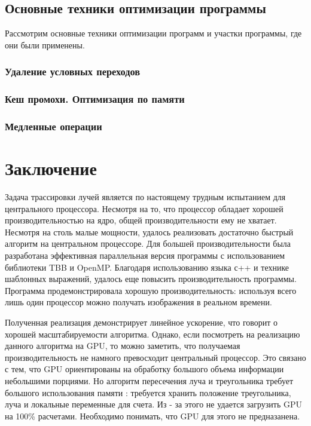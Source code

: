 \documentclass[12pt, a4paper, utf8]{article}
\begin{document}
\subsection{Основные техники оптимизации программы}

Рассмотрим основные техники оптимизации программ и участки программы, где они были применены.

\subsubsection{Удаление условных переходов}


\subsubsection{Кеш промохи. Оптимизация по памяти}


\subsubsection{Медленные операции}



\newpage
\section*{Заключение}
Задача трассировки лучей является по настоящему трудным испытанием для центрального процессора. Несмотря на то, что процессор обладает хорошей производительностью на ядро, общей производительности ему не хватает. Несмотря на столь малые мощности, удалось реализовать достаточно быстрый алгоритм на центральном процессоре. Для большей производительности была разработана эффективная параллельная версия программы с использованием библиотеки TBB и OpenMP. Благодаря использованию языка с++ и технике шаблонных выражений, удалось еще повысить производительность программы. Программа продемонстрировала хорошую производительность: используя всего лишь один процессор можно получать изображения в реальном времени.

Полученная реализация демонстрирует линейное ускорение, что говорит о хорошей масштабируемости алгоритма. Однако, если посмотреть на реализацию данного алгоритма на GPU, то можно заметить, что получаемая производительность не намного превосходит центральный процессор. Это связано с тем, что GPU ориентированы на обработку большого объема информации небольшими порциями. Но алгоритм пересечения луча и треугольника требует большого использования памяти : требуется хранить положение треугольника, луча и локальные переменные для счета. Из - за этого не удается загрузить GPU на 100\% расчетами. Необходимо понимать, что GPU для этого не предназанена.
\end{document}
